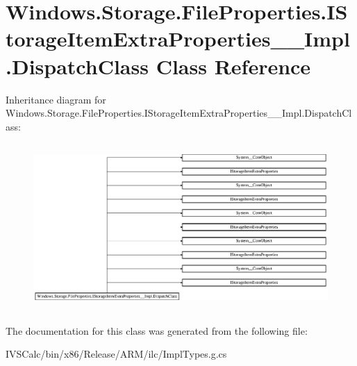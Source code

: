 \hypertarget{class_windows_1_1_storage_1_1_file_properties_1_1_i_storage_item_extra_properties_____impl_1_1_dispatch_class}{}\section{Windows.\+Storage.\+File\+Properties.\+I\+Storage\+Item\+Extra\+Properties\+\_\+\+\_\+\+Impl.\+Dispatch\+Class Class Reference}
\label{class_windows_1_1_storage_1_1_file_properties_1_1_i_storage_item_extra_properties_____impl_1_1_dispatch_class}
Inheritance diagram for Windows.\+Storage.\+File\+Properties.\+I\+Storage\+Item\+Extra\+Properties\+\_\+\+\_\+\+Impl.\+Dispatch\+Class\+:\begin{figure}[H]
\begin{center}
\leavevmode
\includegraphics[height=6.403327cm]{class_windows_1_1_storage_1_1_file_properties_1_1_i_storage_item_extra_properties_____impl_1_1_dispatch_class}
\end{center}
\end{figure}


The documentation for this class was generated from the following file\+:\begin{DoxyCompactItemize}
\item 
I\+V\+S\+Calc/bin/x86/\+Release/\+A\+R\+M/ilc/Impl\+Types.\+g.\+cs\end{DoxyCompactItemize}
